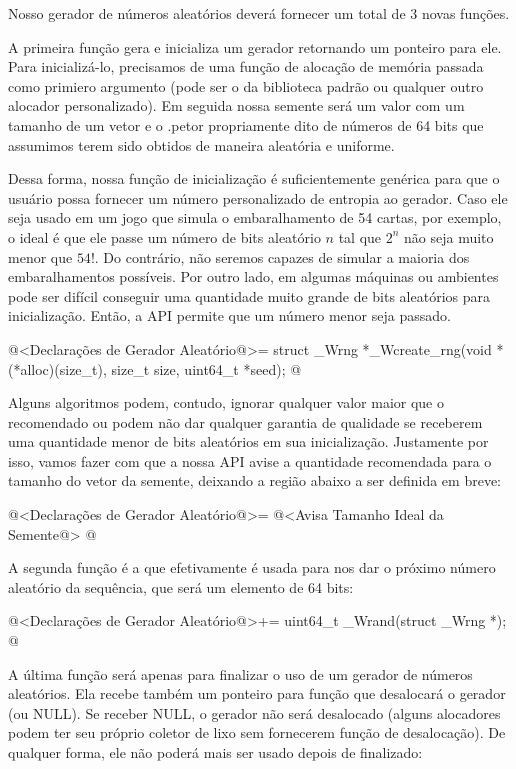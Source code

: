 
Nosso gerador de números aleatórios deverá fornecer um total de 3
novas funções.

A primeira função gera e inicializa um gerador retornando um ponteiro
para ele. Para inicializá-lo, precisamos de uma função de alocação de
memória passada como primiero argumento (pode ser o  da
biblioteca padrão ou qualquer outro alocador personalizado). Em
seguida nossa semente será um valor com um tamanho de um vetor e o
.petor propriamente dito de números de 64 bits que assumimos terem sido
obtidos de maneira aleatória e uniforme.

Dessa forma, nossa função de inicialização é suficientemente genérica
para que o usuário possa fornecer um número personalizado de entropia
ao gerador. Caso ele seja usado em um jogo que simula o embaralhamento
de 54 cartas, por exemplo, o ideal é que ele passe um número de bits
aleatório $n$ tal que $2^n$ não seja muito menor que $54!$. Do
contrário, não seremos capazes de simular a maioria dos
embaralhamentos possíveis. Por outro lado, em algumas máquinas ou
ambientes pode ser difícil conseguir uma quantidade muito grande de
bits aleatórios para inicialização. Então, a API permite que um número
menor seja passado.

\iniciocodigo
@<Declarações de Gerador Aleatório@>=
struct _Wrng *_Wcreate_rng(void *(*alloc)(size_t), size_t size, uint64_t *seed);
@
\fimcodigo

Alguns algoritmos podem, contudo, ignorar qualquer valor maior que o
recomendado ou podem não dar qualquer garantia de qualidade se
receberem uma quantidade menor de bits aleatórios em sua
inicialização. Justamente por isso, vamos fazer com que a nossa API
avise a quantidade recomendada para o tamanho do vetor da semente,
deixando a região abaixo a ser definida em breve:

\iniciocodigo
@<Declarações de Gerador Aleatório@>=
@<Avisa Tamanho Ideal da Semente@>
@
\fimcodigo


A segunda função é a que efetivamente é usada para nos dar o próximo
número aleatório da sequência, que será um elemento de 64 bits:

\iniciocodigo
@<Declarações de Gerador Aleatório@>+=
uint64_t _Wrand(struct _Wrng *);
@
\fimcodigo

A última função será apenas para finalizar o uso de um gerador de
números aleatórios. Ela recebe também um ponteiro para função que
desalocará o gerador (ou NULL). Se receber NULL, o gerador não será
desalocado (alguns alocadores podem ter seu próprio coletor de lixo
sem fornecerem função de desalocação). De qualquer forma, ele não
poderá mais ser usado depois de finalizado:

